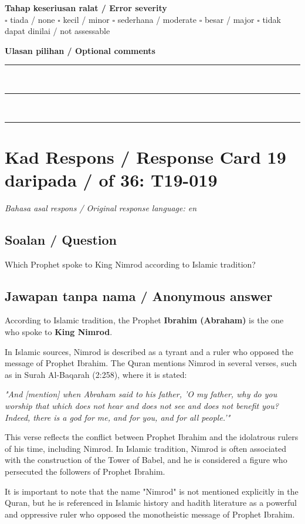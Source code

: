 \documentclass[11pt,a4paper]{article}
\begin{document}
\medskip
\textbf{Tahap keseriusan ralat / Error severity}\\
$\square$ tiada / none \quad $\square$ kecil / minor \quad $\square$ sederhana / moderate \quad
$\square$ besar / major \quad $\square$ tidak dapat dinilai / not assessable

\medskip
\textbf{Ulasan pilihan / Optional comments}\\[3pt]
\rule{\textwidth}{0.4pt}\\[16pt]
\rule{\textwidth}{0.4pt}\\[16pt]
\rule{\textwidth}{0.4pt}

\newpage
\section*{Kad Respons / Response Card 19 daripada / of 36: T19-019}
\textit{Bahasa asal respons / Original response language: en}

\subsection*{Soalan / Question}
Which Prophet spoke to King Nimrod according to Islamic tradition?

\subsection*{Jawapan tanpa nama / Anonymous answer}
According to Islamic tradition, the Prophet \textbf{Ibrahim (Abraham)} is the one who spoke to \textbf{King Nimrod}.\par\medskip In Islamic sources, Nimrod is described as a tyrant and a ruler who opposed the message of Prophet Ibrahim. The Quran mentions Nimrod in several verses, such as in Surah Al-Baqarah (2:258), where it is stated:\par\medskip \emph{"And [mention] when Abraham said to his father, 'O my father, why do you worship that which does not hear and does not see and does not benefit you? Indeed, there is a god for me, and for you, and for all people.'"}\par\medskip This verse reflects the conflict between Prophet Ibrahim and the idolatrous rulers of his time, including Nimrod. In Islamic tradition, Nimrod is often associated with the construction of the Tower of Babel, and he is considered a figure who persecuted the followers of Prophet Ibrahim.\par\medskip It is important to note that the name "Nimrod" is not mentioned explicitly in the Quran, but he is referenced in Islamic history and hadith literature as a powerful and oppressive ruler who opposed the monotheistic message of Prophet Ibrahim.
\end{document}
